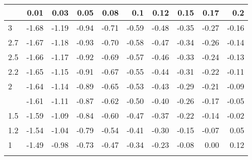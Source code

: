 
\begin{tabular}{lrrrrrrrrr}
\toprule{}
  & 0.01 & 0.03 & 0.05 & 0.08 & 0.1 & 0.12 & 0.15 & 0.17 & 0.2\\
\midrule{}
3 & -1.68 & -1.19 & -0.94 & -0.71 & -0.59 & -0.48 & -0.35 & -0.27 & -0.16\\
2.7 & -1.67 & -1.18 & -0.93 & -0.70 & -0.58 & -0.47 & -0.34 & -0.26 & -0.14\\
2.5 & -1.66 & -1.17 & -0.92 & -0.69 & -0.57 & -0.46 & -0.33 & -0.24 & -0.13\\
2.2 & -1.65 & -1.15 & -0.91 & -0.67 & -0.55 & -0.44 & -0.31 & -0.22 & -0.11\\
2 & -1.64 & -1.14 & -0.89 & -0.65 & -0.53 & -0.43 & -0.29 & -0.21 & -0.09\\
\addlinespace
1.7 & -1.61 & -1.11 & -0.87 & -0.62 & -0.50 & -0.40 & -0.26 & -0.17 & -0.05\\
1.5 & -1.59 & -1.09 & -0.84 & -0.60 & -0.47 & -0.37 & -0.22 & -0.14 & -0.02\\
1.2 & -1.54 & -1.04 & -0.79 & -0.54 & -0.41 & -0.30 & -0.15 & -0.07 & 0.05\\
1 & -1.49 & -0.98 & -0.73 & -0.47 & -0.34 & -0.23 & -0.08 & 0.00 & 0.12\\
\bottomrule{}
\end{tabular}
